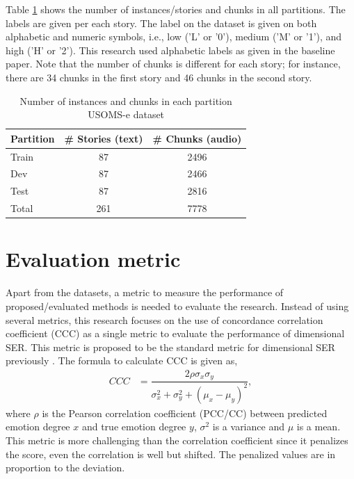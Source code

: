 {Table \ref{tab:dataset} shows the number of instances/stories and chunks in all
partitions. The labels are given per each story. The label on the dataset is
given on both alphabetic and numeric symbols, i.e., low ('L' or '0'), medium
('M' or '1'), and high ('H' or '2'). This research used alphabetic labels as
given in the baseline paper. Note that the number of chunks is different for
each story; for instance, there are 34 chunks in the first story and 46 chunks
in the second story.

\begin{table}[t]
  \caption{Number of instances and chunks in each partition USOMS-e dataset}
  \label{tab:dataset}
  \centering
  \begin{tabular}{ l c c }
    \hline
Partition & \# Stories (text) & \# Chunks (audio) \\
\hline \hline
Train     & 87                & 2496  \\
Dev       & 87                & 2466  \\
Test      & 87                & 2816  \\
    \hline
Total     & 261               & 7778 \\
    \hline
  \end{tabular}
  \end{table}


\section{Evaluation metric}
Apart from the datasets, a metric to measure the performance of
proposed/evaluated methods is needed to evaluate the research. Instead of using
several metrics, this research focuses on the use of concordance correlation
coefficient (CCC) as a single metric to evaluate the performance of dimensional
SER.  This metric is proposed to be the standard metric for dimensional SER
previously \cite{Ringeval2015a}. The formula to calculate CCC is given as, 
\begin{align} 
  CCC &= \dfrac{2 \rho \sigma_x \sigma_y} {\sigma_x^2 + \sigma_y^2 + (\mu_x - \mu_y)^2},
\end{align}
where $\rho$ is the Pearson correlation coefficient (PCC/CC) between predicted
emotion degree $x$ and true emotion degree $y$, $\sigma^2$ is a variance and
$\mu$ is a mean. This metric is more challenging than the correlation
coefficient since it penalizes the score, even the correlation is well but
shifted.  The penalized values are in proportion to the deviation.

}
